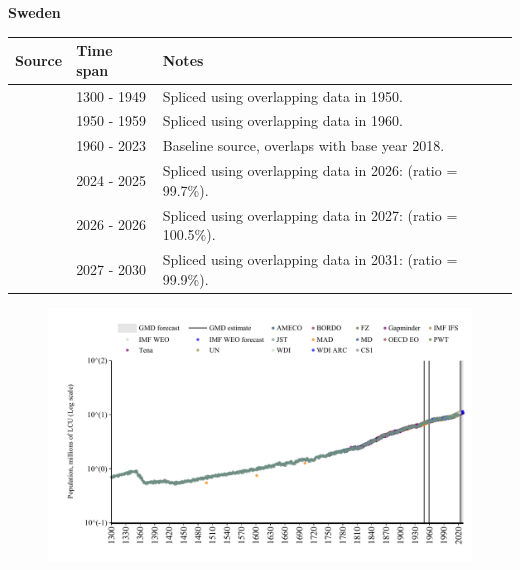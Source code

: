 \documentclass[12pt,a4paper,landscape]{article}
\begin{document}
\begin{adjustbox}{max totalsize={\paperwidth}{\paperheight},center}
\begin{minipage}[t][\textheight][t]{\textwidth}
\vspace*{0.5cm}
{}
\begin{center}
{\Large\bfseries Sweden}
\end{center}
\vspace{0.5cm}
\begin{table}[H]
\centering
\small
\begin{tabular}{|l|l|l|}
\hline
\textbf{Source} & \textbf{Time span} & \textbf{Notes} \\
\hline
\rowcolor{white}\cite{CS1_SWE}& 1300 - 1949 &Spliced using overlapping data in 1950.\\
\rowcolor{lightgray}\cite{IMF_IFS}& 1950 - 1959 &Spliced using overlapping data in 1960.\\
\rowcolor{white}\cite{WDI}& 1960 - 2023 &Baseline source, overlaps with base year 2018.\\
\rowcolor{lightgray}\cite{OECD_EO}& 2024 - 2025 &Spliced using overlapping data in 2026: (ratio = 99.7\%).\\
\rowcolor{white}\cite{AMECO}& 2026 - 2026 &Spliced using overlapping data in 2027: (ratio = 100.5\%).\\
\rowcolor{lightgray}\cite{Gapminder}& 2027 - 2030 &Spliced using overlapping data in 2031: (ratio = 99.9\%).\\
\hline
\end{tabular}
\end{table}
\begin{figure}[H]
\centering
\includegraphics[width=\textwidth,height=0.6\textheight,keepaspectratio]{graphs/SWE_pop.pdf}
\end{figure}
\end{minipage}
\end{adjustbox}
\end{document}

